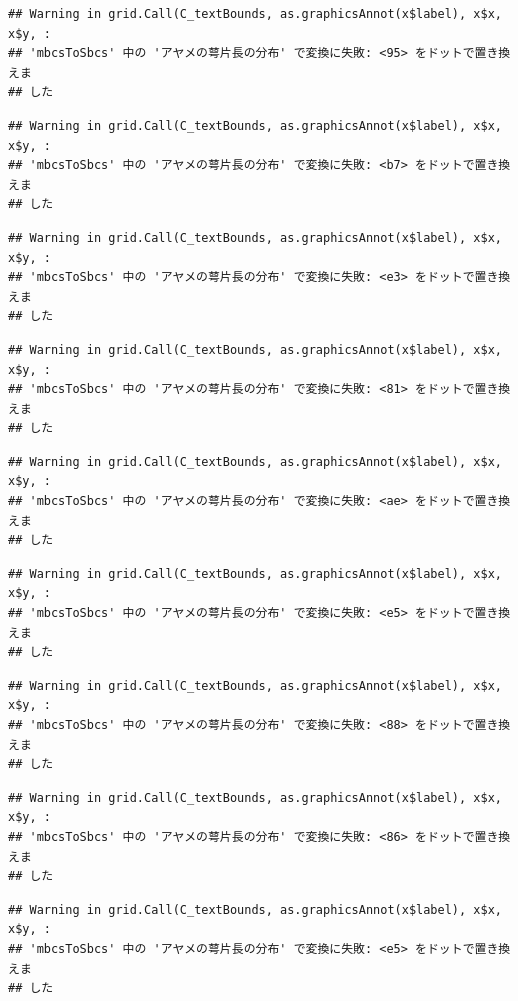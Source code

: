 \documentclass[
]{book}
\begin{document}
\begin{verbatim}
## Warning in grid.Call(C_textBounds, as.graphicsAnnot(x$label), x$x, x$y, :
## 'mbcsToSbcs' 中の 'アヤメの萼片長の分布' で変換に失敗: <95> をドットで置き換えま
## した
\end{verbatim}

\begin{verbatim}
## Warning in grid.Call(C_textBounds, as.graphicsAnnot(x$label), x$x, x$y, :
## 'mbcsToSbcs' 中の 'アヤメの萼片長の分布' で変換に失敗: <b7> をドットで置き換えま
## した
\end{verbatim}

\begin{verbatim}
## Warning in grid.Call(C_textBounds, as.graphicsAnnot(x$label), x$x, x$y, :
## 'mbcsToSbcs' 中の 'アヤメの萼片長の分布' で変換に失敗: <e3> をドットで置き換えま
## した
\end{verbatim}

\begin{verbatim}
## Warning in grid.Call(C_textBounds, as.graphicsAnnot(x$label), x$x, x$y, :
## 'mbcsToSbcs' 中の 'アヤメの萼片長の分布' で変換に失敗: <81> をドットで置き換えま
## した
\end{verbatim}

\begin{verbatim}
## Warning in grid.Call(C_textBounds, as.graphicsAnnot(x$label), x$x, x$y, :
## 'mbcsToSbcs' 中の 'アヤメの萼片長の分布' で変換に失敗: <ae> をドットで置き換えま
## した
\end{verbatim}

\begin{verbatim}
## Warning in grid.Call(C_textBounds, as.graphicsAnnot(x$label), x$x, x$y, :
## 'mbcsToSbcs' 中の 'アヤメの萼片長の分布' で変換に失敗: <e5> をドットで置き換えま
## した
\end{verbatim}

\begin{verbatim}
## Warning in grid.Call(C_textBounds, as.graphicsAnnot(x$label), x$x, x$y, :
## 'mbcsToSbcs' 中の 'アヤメの萼片長の分布' で変換に失敗: <88> をドットで置き換えま
## した
\end{verbatim}

\begin{verbatim}
## Warning in grid.Call(C_textBounds, as.graphicsAnnot(x$label), x$x, x$y, :
## 'mbcsToSbcs' 中の 'アヤメの萼片長の分布' で変換に失敗: <86> をドットで置き換えま
## した
\end{verbatim}

\begin{verbatim}
## Warning in grid.Call(C_textBounds, as.graphicsAnnot(x$label), x$x, x$y, :
## 'mbcsToSbcs' 中の 'アヤメの萼片長の分布' で変換に失敗: <e5> をドットで置き換えま
## した
\end{verbatim}
\end{document}
